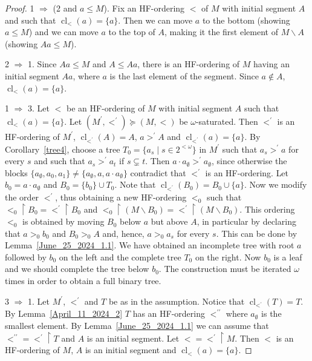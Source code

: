 \documentclass[a4paper, 11pt]{article}
\DeclareMathOperator{\cl}{cl}
\theoremstyle{note}
\begin{document}
\begin{proof} 1 $\Rightarrow$ (2 and $a\leq M$). Fix an HF-ordering $<$ of $M$ with initial segment $A$ and such that $\cl_<(a)=\{a\}$.  Then  we can move $a$ to the bottom (showing $a\leq M$) and we can move $a$ to the top of $A$, making it the first element of $M\smallsetminus A$ (showing $Aa\leq M$).
	
	2 $\Rightarrow$ 1. Since $Aa\leq M$ and $A\leq Aa$, there is an HF-ordering of $M$ having an initial segment $Aa$, where $a$ is the last element of the segment. Since $a\not\in A$,  $\cl_<(a)=\{a\}$.
	
	1 $\Rightarrow$ 3. Let $<$ be an HF-ordering of $M$ with initial segment $A$ such that $\cl_<(a)=\{a\}$.  Let $(M^\prime,<^\prime)\succeq (M,<)$ be $\omega$-saturated. Then $<^\prime$ is an HF-ordering of $M^\prime$, $\cl_{<^\prime}(A)=A$,  $a>^\prime A$ and  $\cl_{<^\prime}(a)=\{a\}$.   By Corollary~\ref{tree4}, choose a tree $T_0=\{a_s\mid s\in 2^{<\omega}\}$ in  $M^\prime$ such that $a_s>^\prime a$  for every $s$ and such that
	$a_s>^\prime a_t$  if  $s\subsetneq t$. Then $a\cdot a_\emptyset>^\prime a_\emptyset$, since otherwise the blocks $\{a_\emptyset,a_0,a_1\}\neq \{a_\emptyset, a, a\cdot a_\emptyset\}$ contradict that $<^\prime$ is an HF-ordering. Let $b_0=a\cdot a_\emptyset$ and $B_0= \{b_0\}\cup T_0$.  Note that $\cl_{<^\prime}(B_0)=B_0\cup\{a\}$. Now we modify the order $<^\prime$, thus obtaining a new HF-ordering $<_0$ such that $<_0\restriction B_0= <^\prime \restriction B_0$ and $ <_0\restriction (M\smallsetminus B_0)= <^\prime\restriction (M\smallsetminus B_0)$. This ordering $<_0$ is obtained by moving  $B_0$  below $a$ but above $A$, in particular by declaring that $a>_0 b_0$ and $B_0>_0 A$ and, hence,  $a>_0a_s$ for every $s$. This can be done by Lemma~\ref{June_25_2024_1.1}. We have obtained an incomplete tree with root $a$ followed by $b_0$ on the left and the complete tree $T_0$ on the right. Now $b_0$ is a leaf and we should complete the tree below $b_0$. The construction must be iterated $\omega$ times in order to obtain a full binary tree.
	
	3 $\Rightarrow$ 1. Let $M^\prime$, $<^\prime$ and $T$ be as in the assumption. Notice that $\cl_{<^\prime}(T)=T$. By Lemma~\ref{April_11_2024_2} $T$ has an HF-ordering $<^{\prime\prime}$ where $a_\emptyset$ is the smallest element. By Lemma~\ref{June_25_2024_1.1} we can assume that $<^{\prime\prime} = <^\prime \restriction T$ and $A$ is an initial segment. Let $<=<^\prime\restriction M$. Then $<$ is an HF-ordering of $M$, $A$ is an initial segment and $\cl_<(a)=\{a\}$.
\end{proof}
\end{document}
